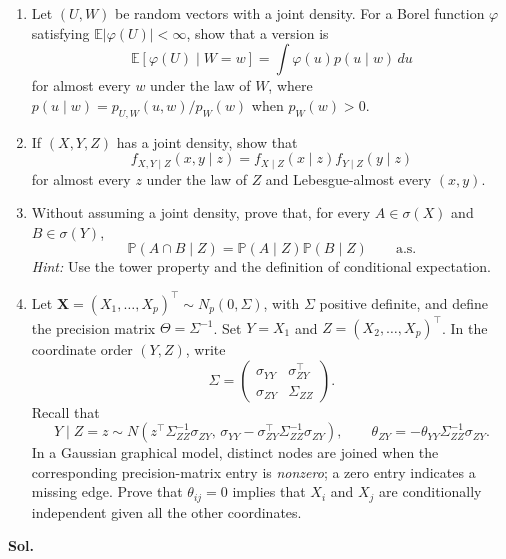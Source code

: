 \documentclass[lang=en,11pt,a4paper,citestyle=authoryear]{elegantpaper}
\newcommand{\E}{\mathbb{E}}
\renewcommand{\P}{\mathbb{P}}
\begin{document}
\begin{enumerate}[label=(\arabic*),leftmargin=*]
\item Let $(U,W)$ be random vectors with a joint density. For a Borel function $\varphi$ satisfying $\E|\varphi(U)|<\infty$, show that a version is
\[
\E[\varphi(U)\mid W=w]=\int\varphi(u)p(u\mid w)\,du
\]
for almost every $w$ under the law of $W$, where $p(u\mid w)=p_{U,W}(u,w)/p_W(w)$ when $p_W(w)>0$.

\item If $(X,Y,Z)$ has a joint density, show that
\[
f_{X,Y\mid Z}(x,y\mid z)=f_{X\mid Z}(x\mid z)f_{Y\mid Z}(y\mid z)
\]
for almost every $z$ under the law of $Z$ and Lebesgue-almost every $(x,y)$.

\item Without assuming a joint density, prove that, for every $A\in\sigma(X)$ and $B\in\sigma(Y)$,
\[
\P(A\cap B\mid Z)=\P(A\mid Z)\P(B\mid Z)\qquad\text{a.s.}
\]
\textit{Hint:} Use the tower property and the definition of conditional expectation.

\item Let $\mathbf{X}=(X_1,\ldots,X_p)^\top\sim N_p(0,\Sigma)$, with $\Sigma$ positive definite, and define the precision matrix $\Theta=\Sigma^{-1}$. Set $Y=X_1$ and $Z=(X_2,\ldots,X_p)^\top$. In the coordinate order $(Y,Z)$, write
\[
\Sigma=\begin{pmatrix}\sigma_{YY}&\sigma_{ZY}^\top\\\sigma_{ZY}&\Sigma_{ZZ}\end{pmatrix}.
\]
Recall that
\[
Y\mid Z=z\sim N\!\left(z^\top\Sigma_{ZZ}^{-1}\sigma_{ZY},\,
\sigma_{YY}-\sigma_{ZY}^\top\Sigma_{ZZ}^{-1}\sigma_{ZY}\right),
\qquad\theta_{ZY}=-\theta_{YY}\Sigma_{ZZ}^{-1}\sigma_{ZY}.
\]
In a Gaussian graphical model, distinct nodes are joined when the corresponding precision-matrix entry is \textit{nonzero}; a zero entry indicates a missing edge. Prove that $\theta_{ij}=0$ implies that $X_i$ and $X_j$ are conditionally independent given all the other coordinates.
\end{enumerate}
\vspace{0.5em}
\textbf{Sol.}\par
\end{document}
